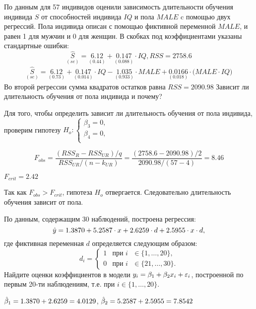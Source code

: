 \begin{problem} %
По данным для 57 индивидов оценили зависимость длительности обучения индивида $S$ 
от способностей индивида $IQ$ и пола $MALE$ c помощью двух регрессий. 
Пола индивида описан с помощью фиктивной переменной $MALE$, и равен 1 для мужчин и 0 для женщин.
В скобках под коэффициентами указаны стандартные ошибки:
\[
\underset{(se)}{\hat{S}}=\underset{(0.44)}{6.12}+\underset{(0.088)}{0.147}\cdot{IQ}, RSS=2758.6
\]
\begin{multline*}
\underset{(se)}{\hat{S}}=\underset{(0.73)}{6.12}+\underset{(0.014)}{0.147}\cdot{IQ}
-\underset{(0.933)}{1.035}\cdot{MALE}+\underset{(0.018)}{0.0166}\cdot{(MALE}\cdot{IQ)}
\end{multline*}
Во второй регрессии сумма квадратов остатков равна $RSS=2090.98$
Зависит ли длительность обучения от пола индивида и почему?


\begin{sol}
  Для того, чтобы определить зависит ли длительность обучения от пола индивида, проверим гипотезу $H_o: 
  \begin{cases}
      \beta_3 =0, \\
      \beta_4 =0, \\
   \end{cases}$
  
\[
  F_{obs} = \frac{(RSS_R - RSS_{UR})/q}{RSS_{UR}/(n-k_{UR})} = 
    \frac{(2758.6-2090.98)/2}{2090.98/(57-4)} = 8.46
\]
  
  $F_{crit} = 2.42 $
  
  Так как $F_{obs} > F_{crit}$, гипотеза $H_o$ отвергается. 
  Следовательно длительность обучения зависит от пола.
\end{sol}
\end{problem}



\begin{problem} %
По данным, содержащим 30 наблюдений, построена регрессия:
\[
\hat{y}=1.3870+5.2587\cdot{x}+2.6259\cdot{d}+2.5955 \cdot{x} \cdot{d},
\]
где фиктивная переменная $d$ определяется следующим образом:
\[
d_i =
  \begin{cases}
    1 & \text{при $i$ $\in \bigl\{ 1,\dots,20 \bigr\} $}, \\
    0 & \text{при $i$ $\in \bigl\{ 21,\dots,30 \bigr\} $}.
 \end{cases}
\]
Найдите оценки коэффициентов в модели $y_i=\beta_1+\beta_2 x_i+\varepsilon_i$, построенной по первым 20-ти наблюдениям, т.е. при $i \in \bigl\{1,\dots,20 \bigr\}$.


\begin{sol}
$\hat{\beta}_1=1.3870+2.6259=4.0129$, $\hat{\beta}_2=5.2587+2.5955=7.8542$
\end{sol}
\end{problem}




